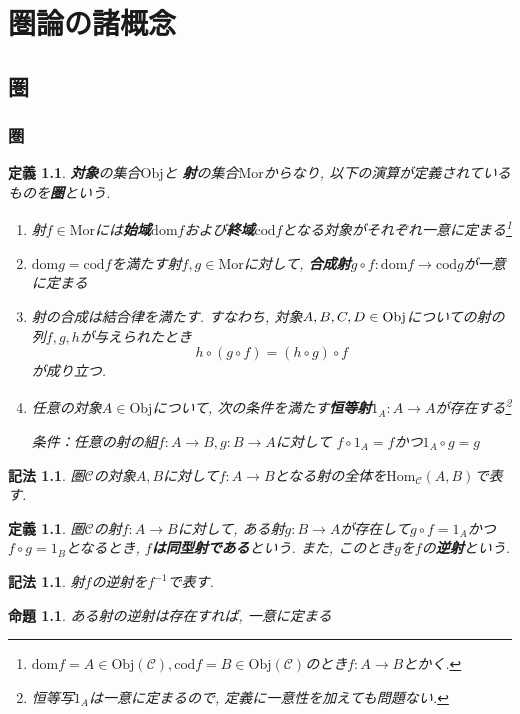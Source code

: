 \documentclass[dvipdfmx]{jsbook}
\theoremstyle{plain}
\newtheorem{Def}[thm]{定義}
\newtheorem{Notation}[thm]{記法}
\newtheorem{Prop}[thm]{命題}
\begin{document}
\part{圏論の諸概念}
\chapter{圏}
\section{圏}
\begin{Def}
{\bf 対象}の集合$\mathrm{Obj}$と
{\bf 射}の集合$\mathrm{Mor}$からなり, 以下の演算が定義されているものを{\bf 圏}という.
\begin{enumerate}
\item 射$f\in\mathrm{Mor}$には{\bf 始域}$\mathrm{dom}f$および{\bf 終域}$\mathrm{cod}f$となる対象がそれぞれ一意に定まる\footnote{$\mathrm{dom}f=A\in\mathrm{Obj}(\mathscr{C}),\mathrm{cod}f=B\in\mathrm{Obj}(\mathscr{C})$のとき$f:A\rightarrow B$とかく.}
\item $\mathrm{dom} g=\mathrm{cod}f$を満たす射$f,g\in\mathrm{Mor}$に対して,
{\bf 合成射}$g\circ f:\mathrm{dom}f\rightarrow\mathrm{cod}g$が一意に定まる
\item 射の合成は結合律を満たす. すなわち, 対象$A,B,C,D\in\rm{Obj}$についての射の列$f,g,h$が与えられたとき
\[
h\circ(g\circ f)=(h\circ g)\circ f
\]
が成り立つ.
\item 任意の対象$A\in\mathrm{Obj}$について,
次の条件を満たす{\bf 恒等射}$1_{A}:A\rightarrow A$が存在する\footnote{恒等写$1_{A}$は一意に定まるので, 定義に一意性を加えても問題ない.}

条件：任意の射の組$f:A\rightarrow B, g:B\rightarrow A$に対して
$f\circ 1_A=f$かつ$1_A\circ g=g$
\end{enumerate}
\end{Def}
\begin{Notation}
圏$\mathscr{C}$の対象$A,B$に対して$f:A\rightarrow B$となる射の全体を$\mathrm{Hom}_{\mathscr{C}}(A,B)$で表す.
\end{Notation}
\begin{Def}
圏$\mathscr{C}$の射$f:A\rightarrow B$に対して,
ある射$g:B\rightarrow A$が存在して$g\circ f=1_A$かつ$f\circ g=1_B$となるとき,
{\bf $f$は同型射である}という. また, このとき$g$を$f$の{\bf 逆射}という.
\end{Def}
\begin{Notation}
射$f$の逆射を$f^{-1}$で表す.
\end{Notation}
\begin{Prop}
ある射の逆射は存在すれば, 一意に定まる
\end{Prop}
\end{document}
